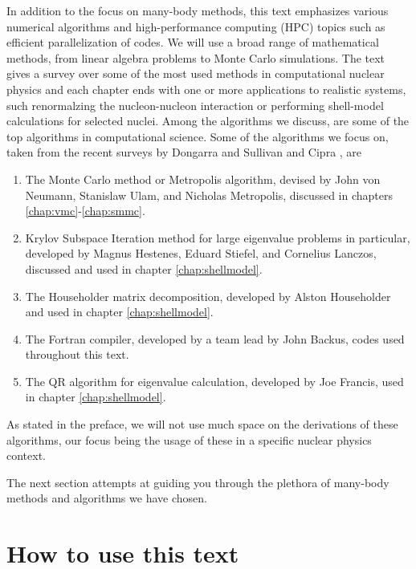 In addition to the focus on many-body methods, this text emphasizes
various numerical algorithms and high-performance computing (HPC)
topics such as efficient parallelization of codes.  We will use a
broad range of mathematical methods, from linear algebra problems to
Monte Carlo simulations.  The text gives a survey over some of the
most used methods in computational nuclear physics and each chapter
ends with one or more applications to realistic systems, such
renormalzing the nucleon-nucleon interaction or performing shell-model
calculations for selected nuclei.  Among the algorithms we discuss,
are some of the top algorithms in computational science.  Some of the
algorithms we focus on, taken from the recent surveys by Dongarra and
Sullivan \cite{top101} and Cipra \cite{top102}, are
\begin{enumerate}
\item The Monte Carlo method or Metropolis algorithm, devised by John
  von Neumann, Stanislaw Ulam, and Nicholas Metropolis, discussed in
  chapters \ref{chap:vmc}-\ref{chap:smmc}.
\item Krylov Subspace Iteration method for large eigenvalue problems
  in particular, developed by Magnus Hestenes, Eduard Stiefel, and
  Cornelius Lanczos, discussed and used in chapter
  \ref{chap:shellmodel}.
\item The Householder matrix decomposition, developed by Alston
  Householder and used in chapter \ref{chap:shellmodel}.
\item The Fortran compiler, developed by a team lead by John Backus,
  codes used throughout this text.
\item The QR algorithm for eigenvalue calculation, developed by Joe
  Francis, used in chapter \ref{chap:shellmodel}.
\end{enumerate}
As stated in the preface, we will not use much space on the
derivations of these algorithms, our focus being the usage of these in
a specific nuclear physics context.


The next section attempts at guiding you through the plethora of
many-body methods and algorithms we have chosen.


\section{How to use this text}\label{sec:introduction_howto}

